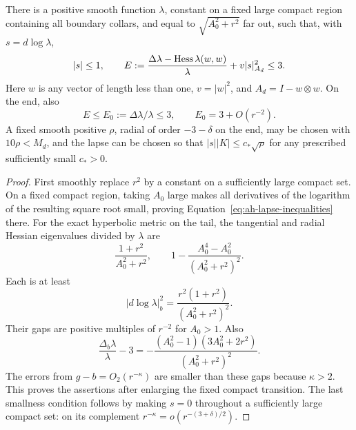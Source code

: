 \begin{lemma}\label{lem:ah-lapse}
There is a positive smooth function \(\lambda\), constant on a fixed
large compact region containing all boundary collars, and equal to
\(\sqrt{A_0^2+r^2}\) far out, such that, with \(s=d\log\lambda\),
\begin{equation}\label{eq:ah-lapse-inequalities}
 |s|\le1,\qquad
 E:=\frac{\Delta\lambda-\operatorname{Hess}\lambda(w,w)}{\lambda}
           +v|s|_{A_d}^2\le3 .
\end{equation}
Here \(w\) is any vector of length less than one, \(v=|w|^2\), and
\(A_d=I-w\otimes w\).  On the end, also
\[
 E\le E_0:=\Delta\lambda/\lambda\le3,\qquad
 E_0=3+O(r^{-2}).
\]
A fixed smooth positive \(\rho\), radial of order \(-3-\delta\) on
the end, may be chosen with \(10\rho<M_d\), and the lapse can be
chosen so that \(|s||K|\le c_*\sqrt\rho\) for any prescribed
sufficiently small \(c_*>0\).
\end{lemma}

\begin{proof}
First smoothly replace \(r^2\) by a constant on a sufficiently large
compact set.  On a fixed compact region, taking \(A_0\) large makes
all derivatives of the logarithm of the resulting square root
small, proving Equation~\eqref{eq:ah-lapse-inequalities} there.
For the exact hyperbolic metric on the tail, the tangential and
radial Hessian eigenvalues divided by \(\lambda\) are
\[
 \frac{1+r^2}{A_0^2+r^2},
 \qquad
 1-\frac{A_0^4-A_0^2}{(A_0^2+r^2)^2}.
\]
Each is at least
\[
 |d\log\lambda|_b^2
 =\frac{r^2(1+r^2)}{(A_0^2+r^2)^2}.
\]
Their gaps are positive multiples of \(r^{-2}\) for \(A_0>1\).
Also
\[
 \frac{\Delta_b\lambda}{\lambda}-3
 =-\frac{(A_0^2-1)(3A_0^2+2r^2)}
           {(A_0^2+r^2)^2}.
\]
The errors from \(g-b=O_2(r^{-\kappa})\) are smaller than these gaps
because \(\kappa>2\).  This proves the assertions after enlarging
the fixed compact transition.  The last smallness condition follows
by making \(s=0\) throughout a sufficiently large compact set:
on its complement \(r^{-\kappa}=o(r^{-(3+\delta)/2})\).
\end{proof}

